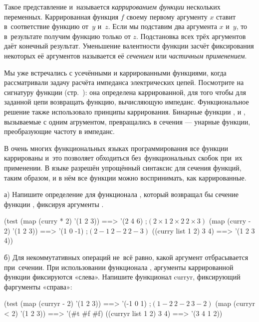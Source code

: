Такое представление и~называется \emph{каррированием функции} нескольких переменных. Каррированная функция $f$ своему первому аргументу $x$ ставит в~соответствие функцию от~$y$ и~$z$. Если мы подставим два аргумента $x$ и~$y$, то в~результате получим функцию только от $z$. Подстановка всех трёх аргументов даёт конечный результат. Уменьшение валентности функции засчёт фиксирования некоторых её аргументов называется её \emph{сечением} или \emph{частичным применением}.

Мы уже встречались с усечёнными и каррированными функциями, когда рассматривали задачу расчёта импеданса электрических цепей. Посмотрите на сигнатуру функции  (стр.~\pageref{example:impedance}): она определена каррированной, для того чтобы для заданной цепи возвращать функцию, вычисляющую импеданс. Функциональное решение также использовало принципы каррирования. Бинарные функции ,  и , вызываемые с одним агрументом, превращались в сечения --- унарные функции, преобразующие частоту в импеданс.

\label{ML-notation}В очень многих функциональных языках программирования все функции каррированы и~это позволяет обходиться без~функциональных скобок при~их применении. В языке \Scheme разрешён упрощённый синтаксис для сечения функций, таким образом, и в нём все функции можно воспринимать, как каррированные.

\begin{Assignment}

  а) Напишите определение для функционала , который возвращал бы сечение функции , фиксируя аргументы . 

  \begin{Specification}
(test
  (map (curry * 2) '(1 2 3)) ==> '(2 4 6)  ;$(2\times1\ 2\times2\ 2\times3)$
  (map (curry - 2) '(1 2 3)) ==> '(1 0 -1) ;$(2-1\ 2-2\ 2-3)$
  ((curry list 1 2) 3 4)     ==> '(1 2 3 4))
  \end{Specification}

  б) Для некоммутативных операций не~всё равно, какой аргумент отбрасывается при~сечении. При использовании функционала , аргументы каррированной функции фиксируются «слева». Напишите функционал \si{curryr}, фиксирующий фаргументы «справа»: 

  \begin{Specification}
(test 
  (map (curryr - 2) '(1 2 3)) ==> '(-1 0 1)   ;$(1-2\ 2-2\ 3-2)$   
  (map (curryr < 2) '(1 2 3)) ==> '(#t #f #f)
  ((curryr list 1 2) 3 4)     ==> '(3 4 1 2))  
  \end{Specification}
\end{Assignment}

